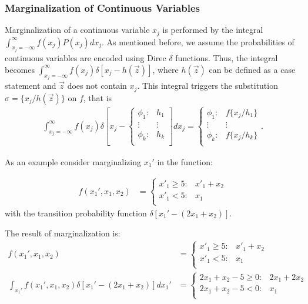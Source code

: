 \documentclass[twoside,11pt]{article}
\begin{document}
\subsubsection{Marginalization of Continuous Variables}
\label{MargContVar}
Marginalization of a continuous variable $x_j$ is performed by the integral
$\int_{x_j= - \infty}^{\infty} f(x_j) P(x_j) d x_j$. As mentioned before, we assume the probabilities of continuous variables are encoded using Direc $\delta$ functions. Thus, the integral becomes 
 $\int_{x_j= - \infty}^{\infty} f(x_j)\delta[x_j - h(\vec{z})]$, where $h(\vec{z})$ can be defined as a case statement and $\vec{z}$ does not contain $x_j$. This integral triggers the substitution $\sigma = \{ x_j / h(\vec{z}) \}$ on $f$, that is
\begin{align}
\int_{x_j =-\infty}^{\infty} f(x_j)
\delta\left[ x_j - \begin{cases}
    \phi_1: & h_1 \\ 
   \vdots&\vdots\\ 
    \phi_k: & h_k \\ 
  \end{cases} \right] dx_j =%
  \begin{cases}
    \phi_1: & f \{ x_j / h_1 \} \\ 
   \vdots&\vdots\\ 
    \phi_k: & f \{ x_j/ h_k \}  \\ 
  \end{cases}. \label{eq:gen_int}
\end{align}

As an example consider marginalizing $x_1'$ in the function:

\begin{align*}
f (x_1',x_1,x_2)&= \begin{cases}
    x'_1 \geq 5 : & x'_1 + x_2 \\ 
    x'_1 < 5: & x_1 \\ 
  \end{cases} 
\end{align*}
with the transition probability function $\delta\left[ x_1' - (2x_1 + x_2) \right]$. 

The result of marginalization is: 
\begin{align*}
f (x_1',x_1,x_2)&= \begin{cases}
    x'_1 \geq 5 : & x'_1 + x_2 \\ 
    x'_1 < 5: & x_1 \\ 
  \end{cases} 
 \\
 \int_{x_1'} f(x_1',x_1,x_2)\delta\left[ x_1'- (2x_1+x_2) \right] dx_1'&= \begin{cases}
   2x_1 + x_2 - 5 \geq 0 : & 2x_1 + 2x_2 \\ 
    2x_1 + x_2 -5  < 0 : & x_1 \\
  \end{cases}
  \end{align*}
 
\end{document}
